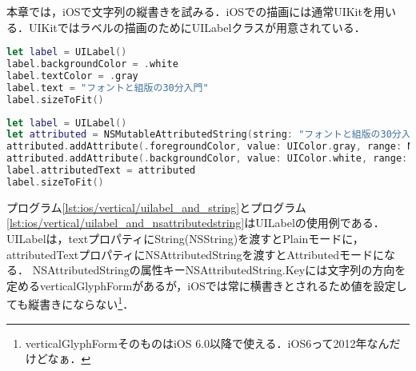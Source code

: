 本章では，iOSで文字列の縦書きを試みる．iOSでの描画には通常UIKitを用いる．UIKitではラベルの描画のために{\sf UILabel}クラスが用意されている．

\begin{lstlisting}[language=swift,caption=Plainモードの{\sf UILabel},label=lst:ios/vertical/uilabel_and_string]
let label = UILabel()
label.backgroundColor = .white
label.textColor = .gray
label.text = "フォントと組版の30分入門"
label.sizeToFit()
\end{lstlisting}

\begin{lstlisting}[language=swift,caption=Attributedモードの{\sf UILabel},label=lst:ios/vertical/uilabel_and_nsattributedstring]
let label = UILabel()
let attributed = NSMutableAttributedString(string: "フォントと組版の30分入門")
attributed.addAttribute(.foregroundColor, value: UIColor.gray, range: NSRange(location: 0, length: 7))
attributed.addAttribute(.backgroundColor, value: UIColor.white, range: NSRange(location: 0, length: 13))
label.attributedText = attributed
label.sizeToFit()
\end{lstlisting}

プログラム\ref{lst:ios/vertical/uilabel_and_string}とプログラム\ref{lst:ios/vertical/uilabel_and_nsattributedstring}は{\sf UILabel}の使用例である．{\sf UILabel}は，{\sf text}プロパティに{\sf String}({\sf NSString})を渡すとPlainモードに，{\sf attributedText}プロパティに{\sf NSAttributedString}を渡すとAttributedモードになる\cite{developer.apple.com:documentation/uikit/uilabel}．
{\sf NSAttributedString}の属性キー{\sf NSAttributedString.Key}には文字列の方向を定める{\sf verticalGlyphForm}があるが，iOSでは常に横書きとされるため値を設定しても縦書きにならない\footnote{{\sf verticalGlyphForm}そのものはiOS 6.0以降で使える．iOS6って2012年なんだけどなぁ．}\cite{developer.apple.com:documentation/foundation/nsattributedstring/key/1528658-verticalglyphform}．

